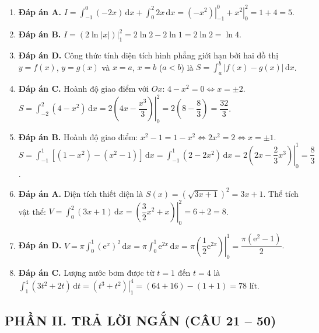 \documentclass[12pt,a4paper]{article}
\begin{document}
\begin{enumerate}
\item \textbf{Đáp án A.}  
$I = \int_{-1}^0 (-2x)\,\mathrm{d}x + \int_0^2 2x\,\mathrm{d}x = \left.(-x^2)\right|_{-1}^0 + \left.x^2\right|_0^2 = 1 + 4 = 5$.

\item \textbf{Đáp án B.}  
$I = \left.(2\ln|x|)\right|_1^2 = 2\ln 2 - 2\ln 1 = 2\ln 2 = \ln 4$.

\item \textbf{Đáp án D.}  
Công thức tính diện tích hình phẳng giới hạn bởi hai đồ thị $y = f(x)$, $y = g(x)$ và $x = a$, $x = b$ ($a < b$) là $S = \int_a^b |f(x) - g(x)|\,\mathrm{d}x$.

\item \textbf{Đáp án C.}  
Hoành độ giao điểm với $Ox$: $4 - x^2 = 0 \iff x = \pm 2$.  
$S = \int_{-2}^2 (4 - x^2)\,\mathrm{d}x = 2\left.\left(4x - \dfrac{x^3}{3}\right)\right|_0^2 = 2\left(8 - \dfrac{8}{3}\right) = \dfrac{32}{3}$.

\item \textbf{Đáp án B.}  
Hoành độ giao điểm: $x^2 - 1 = 1 - x^2 \iff 2x^2 = 2 \iff x = \pm 1$.  
$S = \int_{-1}^1 [(1 - x^2) - (x^2 - 1)]\,\mathrm{d}x = \int_{-1}^1 (2 - 2x^2)\,\mathrm{d}x = 2\left.\left(2x - \dfrac{2}{3}x^3\right)\right|_0^1 = \dfrac{8}{3}$.

\item \textbf{Đáp án A.}  
Diện tích thiết diện là $S(x) = \left(\sqrt{3x + 1}\right)^2 = 3x + 1$.  
Thể tích vật thể: $V = \int_0^2 (3x + 1)\,\mathrm{d}x = \left.\left(\dfrac{3}{2}x^2 + x\right)\right|_0^2 = 6 + 2 = 8$.

\item \textbf{Đáp án D.}  
$V = \pi\int_0^1 \left(\mathrm{e}^x\right)^2\,\mathrm{d}x = \pi\int_0^1 \mathrm{e}^{2x}\,\mathrm{d}x = \pi\left.\left(\dfrac{1}{2}\mathrm{e}^{2x}\right)\right|_0^1 = \dfrac{\pi(\mathrm{e}^2 - 1)}{2}$.

\item \textbf{Đáp án C.}  
Lượng nước bơm được từ $t = 1$ đến $t = 4$ là $\int_1^4 (3t^2 + 2t)\,\mathrm{d}t = \left.\left(t^3 + t^2\right)\right|_1^4 = (64 + 16) - (1 + 1) = 78\text{ lít}$.
\end{enumerate}

\subsection*{PHẦN II. TRẢ LỜI NGẮN (CÂU 21 -- 50)}
\end{document}
